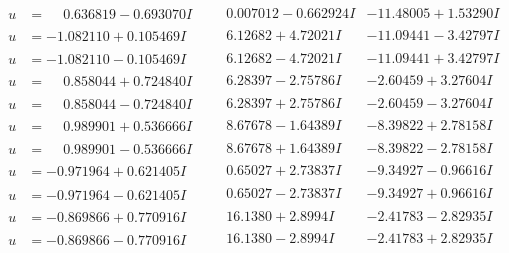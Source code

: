 \documentclass[1p]{elsarticle_modified}
\theoremstyle{definition}
\begin{document}
$$\begin{array}{c|c|c}
\begin{aligned}
u &= \phantom{-}0.636819 - 0.693070 I\end{aligned}
 & \phantom{-}0.007012 - 0.662924 I & -11.48005 + 1.53290 I \\ \hline\begin{aligned}
u &= -1.082110 + 0.105469 I\end{aligned}
 & \phantom{-}6.12682 + 4.72021 I & -11.09441 - 3.42797 I \\ \hline\begin{aligned}
u &= -1.082110 - 0.105469 I\end{aligned}
 & \phantom{-}6.12682 - 4.72021 I & -11.09441 + 3.42797 I \\ \hline\begin{aligned}
u &= \phantom{-}0.858044 + 0.724840 I\end{aligned}
 & \phantom{-}6.28397 - 2.75786 I & -2.60459 + 3.27604 I \\ \hline\begin{aligned}
u &= \phantom{-}0.858044 - 0.724840 I\end{aligned}
 & \phantom{-}6.28397 + 2.75786 I & -2.60459 - 3.27604 I \\ \hline\begin{aligned}
u &= \phantom{-}0.989901 + 0.536666 I\end{aligned}
 & \phantom{-}8.67678 - 1.64389 I & -8.39822 + 2.78158 I \\ \hline\begin{aligned}
u &= \phantom{-}0.989901 - 0.536666 I\end{aligned}
 & \phantom{-}8.67678 + 1.64389 I & -8.39822 - 2.78158 I \\ \hline\begin{aligned}
u &= -0.971964 + 0.621405 I\end{aligned}
 & \phantom{-}0.65027 + 2.73837 I & -9.34927 - 0.96616 I \\ \hline\begin{aligned}
u &= -0.971964 - 0.621405 I\end{aligned}
 & \phantom{-}0.65027 - 2.73837 I & -9.34927 + 0.96616 I \\ \hline\begin{aligned}
u &= -0.869866 + 0.770916 I\end{aligned}
 & \phantom{-}16.1380 + 2.8994 I & -2.41783 - 2.82935 I \\ \hline\begin{aligned}
u &= -0.869866 - 0.770916 I\end{aligned}
 & \phantom{-}16.1380 - 2.8994 I & -2.41783 + 2.82935 I \\ \hline\begin{aligned}

\end{aligned}
\end{array}$$
\end{document}
